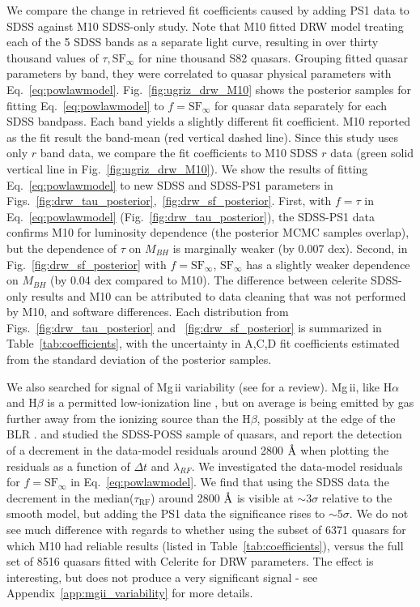\documentclass[twocolumn]{aastex62}
\let\oldAA\AA
\renewcommand{\AA}{\text{\normalfont\oldAA}}
\newcommand{\project}[1]{\textsf{#1}}
\begin{document}
We compare the change in retrieved fit coefficients caused by adding PS1 data to SDSS against M10 SDSS-only study. Note that M10 fitted  DRW model treating each of the 5 SDSS bands as a separate light curve, resulting in over thirty thousand values of $\tau, \mathrm{SF}_{\infty}$ for nine thousand S82 quasars. Grouping fitted quasar parameters by band, they were correlated to quasar physical parameters with Eq.~\ref{eq:powlawmodel}. Fig.~\ref{fig:ugriz_drw_M10} shows the posterior samples for fitting  Eq.~\ref{eq:powlawmodel} to $f=\mathrm{SF}_{\infty}$ for quasar data separately for each SDSS bandpass.  Each band yields a slightly different fit coefficient. M10 reported as the fit result the band-mean (red vertical dashed line). Since this study uses only $r$ band data, we compare the fit coefficients to M10 SDSS $r$ data (green solid vertical line in Fig.~\ref{fig:ugriz_drw_M10}). We show the results of fitting Eq.~\ref{eq:powlawmodel} to new SDSS and SDSS-PS1 parameters in Figs.~\ref{fig:drw_tau_posterior},~\ref{fig:drw_sf_posterior}. First, with $f=\tau$ in Eq.~\ref{eq:powlawmodel} (Fig.~\ref{fig:drw_tau_posterior}), the SDSS-PS1 data confirms M10 for luminosity dependence (the posterior MCMC samples overlap), but the dependence of $\tau$  on $M_{BH}$  is marginally weaker (by 0.007 dex). Second, in Fig.~\ref{fig:drw_sf_posterior} with  $f=\mathrm{SF}_{\infty}$, $\mathrm{SF}_{\infty}$ has a slightly weaker dependence on $M_{BH}$ (by 0.04 dex compared to M10). The difference between \project{celerite} SDSS-only results and M10 can be attributed to data cleaning that was not performed by M10, and software differences. Each distribution from 
Figs.~\ref{fig:drw_tau_posterior} and ~\ref{fig:drw_sf_posterior} is summarized in Table~\ref{tab:coefficients}, with the uncertainty in A,C,D fit coefficients estimated from  the standard deviation of the posterior samples. 

We also searched for signal of Mg\,{\sc ii} variability (see \citealt{cackett2015} for a review). Mg\,{\sc ii}, like  H$\alpha$  and  H$\beta$  is a permitted low-ionization line \citep{yang2020}, but on average is being emitted by gas further away from the ionizing source than the  H$\beta$, possibly at the edge of the BLR \citep{guo2020}. \cite{ivezic2004} and \cite{macleod2012} studied the SDSS-POSS sample of quasars, and report the detection of a decrement in the data-model residuals around 2800 $\mbox{\AA}$ when plotting the residuals as a function of $\Delta t$ and $\lambda_{RF}$. We investigated the data-model residuals for $f=\mathrm{SF}_{\infty}$ in Eq.~\ref{eq:powlawmodel}. We find that using the SDSS data the decrement in the median($\tau_{\mathrm{RF}}$) around 2800 $\mbox{\AA}$ is visible at $\sim 3 \sigma$  relative to the smooth model, but adding the PS1 data the significance rises to $\sim 5 \sigma$. We do not see much difference with regards to whether using the subset of 6371 quasars for which M10 had reliable results (listed in Table~\ref{tab:coefficients}), versus  the full set of 8516 quasars fitted with Celerite for DRW parameters. The effect is interesting, but does not produce a very significant signal - see Appendix~\ref{app:mgii_variability} for more details. 
\end{document}
